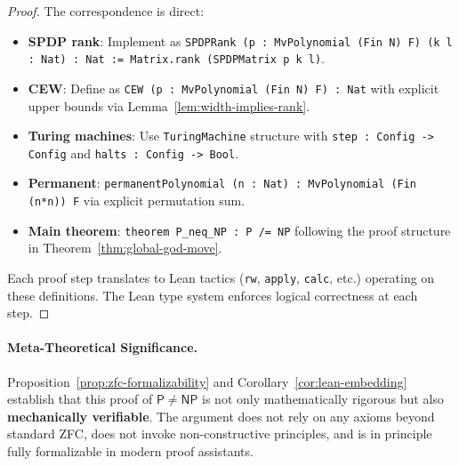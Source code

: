 \documentclass[12pt]{article}
\theoremstyle{definition}
\theoremstyle{definition}
\theoremstyle{remark}
\theoremstyle{remark}
\begin{document}
\begin{proof}
The correspondence is direct:
\begin{itemize}
\item \textbf{SPDP rank}: Implement as \texttt{SPDPRank (p : MvPolynomial (Fin N) F) (k l : Nat) : Nat := Matrix.rank (SPDPMatrix p k l)}.
\item \textbf{CEW}: Define as \texttt{CEW (p : MvPolynomial (Fin N) F) : Nat} with explicit upper bounds via Lemma~\ref{lem:width-implies-rank}.
\item \textbf{Turing machines}: Use \texttt{TuringMachine} structure with \texttt{step : Config -> Config} and \texttt{halts : Config -> Bool}.
\item \textbf{Permanent}: \texttt{permanentPolynomial (n : Nat) : MvPolynomial (Fin (n*n)) F} via explicit permutation sum.
\item \textbf{Main theorem}: \texttt{theorem P\_neq\_NP : P /= NP} following the proof structure in Theorem~\ref{thm:global-god-move}.
\end{itemize}
Each proof step translates to Lean tactics (\texttt{rw}, \texttt{apply}, \texttt{calc}, etc.) operating on these definitions. The Lean type system enforces logical correctness at each step.
\end{proof}

\paragraph{Meta-Theoretical Significance.}
Proposition~\ref{prop:zfc-formalizability} and Corollary~\ref{cor:lean-embedding} establish that this proof of $\mathsf{P} \neq \mathsf{NP}$ is not only mathematically rigorous but also \textbf{mechanically verifiable}. The argument does not rely on any axioms beyond standard ZFC, does not invoke non-constructive principles, and is in principle fully formalizable in modern proof assistants.

\end{document}
